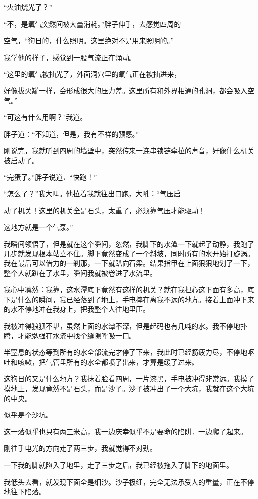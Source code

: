 “火油烧光了？”

“不，是氧气突然间被大量消耗。”胖子伸手，去感觉四周的

空气，“狗日的，什么照明。这里绝对不是用来照明的。”

我学他的样子，感觉到一股气流正在涌动。

“这里的氧气被抽光了，外面洞穴里的氧气正在被抽进来，

好像拔火罐一样，会形成很大的压力差。这里所有和外界相通的孔洞，都会吸入空气。”

“可这有什么用啊？”我道。

胖子道：“不知道，但是，我有不祥的预感。”

刚说完，我就听到四周的墙壁中，突然传来一连串锁链牵拉的声音，好像什么机关被启动了。

“完蛋了。”胖子说道，“快跑！”

“怎么了？”我大叫。他拉着我就往出口跑，大吼：“气压启

动了机关！这里的机关全是石头，太重了，必须靠气压才能驱动！

这地方就是一个气泵。”

我瞬间领悟了，但是就在这个瞬间，忽然，我脚下的水潭一下就起了动静，我跑了几步就发现根本站立不住。脚下竟然变成了一个斜坡，同时所有的水开始打旋涡。我在最后可以借力的一刹那，一下就趴向石梁。结果指甲在上面狠狠地划了一下，整个人就趴在了水里，瞬间我就被卷进了水流里。

我心中凛然：我靠，这水潭底下竟然有这样的机关？就在我担心这下面有多高，底下是什么的瞬间，我已经落到了地上，手电摔在离我不远的地方。接着上面冲下来的水不停地冲在我身上，把我整个人往地里压。

我被冲得狼狈不堪，虽然上面的水潭不深，但是起码也有几吨的水。我不停地扑腾，才能勉强在水流中找个缝隙呼吸一口。

半窒息的状态等到所有的水全部流完才停了下来，我此时已经筋疲力尽，不停地呕吐和咳嗽，把气管里所有的水全都喷了出来，才算是缓了过来。

这狗日的又是什么地方？我抹着脸看四周，一片漆黑，手电被冲得非常远。我摸了摸地上，发现竟然不是石头，而是沙子。沙子被冲出了一个大坑，我就在这个大坑的中央。

似乎是个沙坑。

这一落似乎也只有两三米高，我一边庆幸似乎不是要命的陷阱，一边爬了起来。

刚往手电光的方向走了两三步，我就觉得不对劲。

一下我的脚就陷入了地里，走了三步之后，我已经被拖入了脚下的地面里。

我低头去看，就发现下面全是细沙。沙子极细，完全无法承受人的重量，正在不停地往下陷落。

